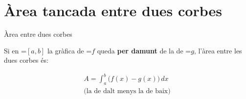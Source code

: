 \documentclass[11pt,a4paper]{article}
\newcommand{\fmm}[1]{\setbox0=\hbox{$#1$}\ifdim\wd0>\linewidth\[#1\]\else\mbox{\box0}\fi}
\begin{document}
\section{Àrea tancada entre dues corbes}\hypertarget{sec7}{}

  

  
\begin{fmdef}{Àrea entre dues corbes}
\par\noindent \begin{minipage}[t]{0.48\linewidth}\vspace{0pt}\raggedright Si en \fmm{[a,b]} la gràfica de \fmm{f} queda \textbf{per damunt} de la de \fmm{g}, l'àrea entre les dues corbes és:

          
\[\begin{gathered}A=\int_a^b\big(f(x)-g(x)\big)\,dx\\\text{(la de dalt menys la de baix)}\end{gathered}\]

          


\end{minipage}
\end{fmdef}
\end{document}
